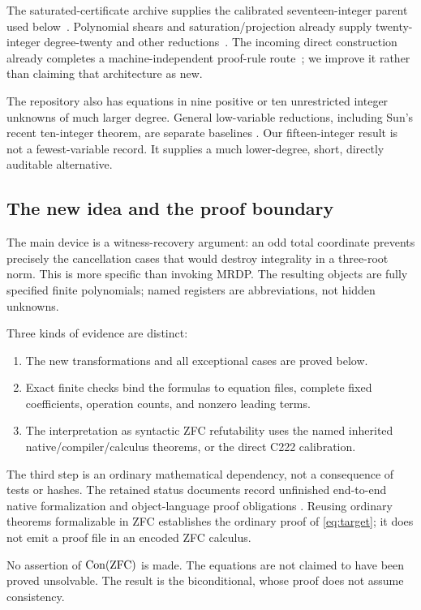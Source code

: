 \documentclass[11pt,letterpaper]{article}
\theoremstyle{remark}\newtheorem{remark}[theorem]{Remark}
\newcommand{\Con}{\operatorname{Con}}\newcommand{\Refut}{\operatorname{Ref}}
\begin{document}
The saturated-certificate archive supplies the calibrated
seventeen-integer parent used below~\cite{sat}. Polynomial shears and
saturation/projection already supply twenty-integer degree-twenty and other
reductions~\cite{shears,projection}. The incoming direct construction already
completes a machine-independent proof-rule route~\cite{round12}; we improve
it rather than claiming that architecture as new.

The repository also has equations in nine positive or ten unrestricted
integer unknowns of much larger degree. General low-variable reductions,
including Sun's recent ten-integer theorem, are separate baselines
\cite{sun,jones}. Our fifteen-integer result is not a fewest-variable record.
It supplies a much lower-degree, short, directly auditable alternative.

\subsection{The new idea and the proof boundary}
The main device is a witness-recovery argument: an odd total coordinate
prevents precisely the cancellation cases that would destroy integrality
in a three-root norm. This is more specific than invoking MRDP.
The resulting objects are fully specified finite polynomials; named
registers are abbreviations, not hidden unknowns.

Three kinds of evidence are distinct:
\begin{enumerate}
\item The new transformations and all exceptional cases are proved below.
\item Exact finite checks bind the formulas to equation files, complete
fixed coefficients, operation counts, and nonzero leading terms.
\item The interpretation as syntactic ZFC refutability uses the named
inherited native/compiler/calculus theorems, or the direct C222 calibration.
\end{enumerate}
The third step is an ordinary mathematical dependency, not a consequence
of tests or hashes. The retained status documents record unfinished
end-to-end native formalization and object-language proof obligations
\cite{status}. Reusing ordinary theorems formalizable in ZFC establishes
the ordinary proof of \eqref{eq:target}; it does not emit a proof file in
an encoded ZFC calculus.

No assertion of $\Con(\ZFC)$ is made. The equations are not claimed to
have been proved unsolvable. The result is the biconditional, whose proof
does not assume consistency.
\end{document}

